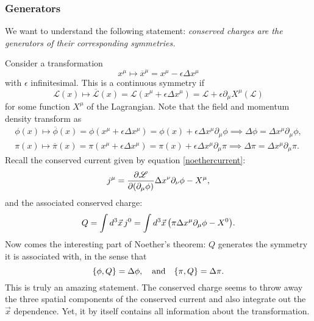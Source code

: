 \documentclass{article}
\begin{document}
\subsubsection{Generators}
We want to understand the following statement: \textit{conserved charges are the generators of their corresponding symmetries.}
\par
Consider a transformation
\begin{equation}
	x^{\mu} \longmapsto \overbar{x}^{\mu} = x^{\mu} - \epsilon \Delta x^{\mu}
\end{equation}
with $ \epsilon $ infinitesimal. This is a continuous symmetry if
\begin{equation}
	\mathscr{L}(x) \longmapsto \overbar{\mathscr{L}}(x) = \mathscr{L}(x^{\mu} + \epsilon \Delta x^{\mu}) = \mathscr{L} + \epsilon \partial_{\mu} X^{\mu} (\mathscr{L})
\end{equation}
for some function $ X^{\mu} $ of the Lagrangian. Note that the field and momentum density transform as
\begin{gather}
	\phi(x) \longmapsto \overbar{\phi}(x) = \phi(x^{\mu} + \epsilon \Delta x^{\mu}) = \phi(x) + \epsilon \Delta x^{\mu} \partial_{\mu} \phi \implies \Delta \phi = \Delta x^{\mu} \partial_{\mu} \phi, \\
	\pi(x) \longmapsto \overbar{\pi} (x) = \pi (x^{\mu} + \epsilon \Delta x^{\mu}) = \pi (x) + \epsilon \Delta x^{\mu} \partial_{\mu} \pi \implies \Delta \pi = \Delta x^{\mu} \partial_{\mu} \pi.
\end{gather}
Recall the conserved current given by equation \eqref{noethercurrent}:
\begin{equation}
	j^{\mu} = \pdv{\mathscr{L}}{(\partial_{\mu} \phi)} \Delta x^{\nu} \partial_{\nu} \phi - X^{\mu},
\end{equation}
and the associated conserved charge:
\begin{equation}
	Q = \int \dd[3]{\vec{x}} j^{0} = \int \dd[3]{\vec{x}} \qty(\pi \Delta x^{\mu} \partial_{\mu} \phi - X^{0}).
\end{equation}
Now comes the interesting part of Noether's theorem: $ Q $ generates the symmetry it is associated with, in the sense that
\begin{equation}
	\{ \phi, Q \} = \Delta \phi, \qq{and} \{\pi, Q \} = \Delta \pi.
\end{equation}
This is truly an amazing statement. The conserved charge seems to throw away the three spatial components of the conserved current and also integrate out the $ \vec{x} $ dependence. Yet, it by itself contains all information about the transformation.
\end{document}
